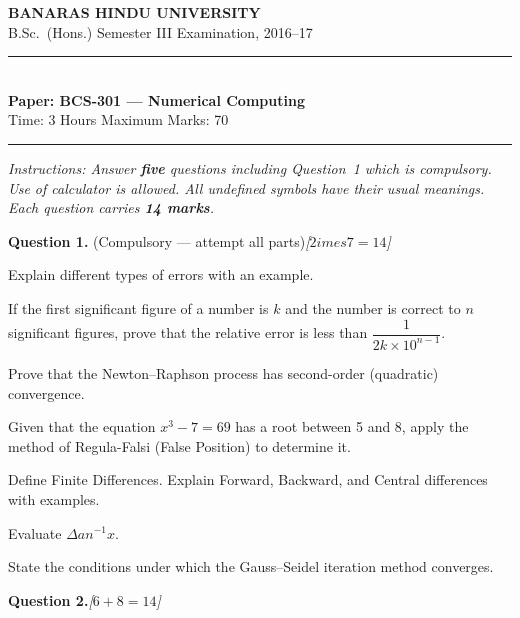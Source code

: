 \documentclass[11pt,a4paper]{article}
\newcommand{\pts}[1]{\hfill   \textit{[#1]}}
\begin{document}
\begin{center}
  {\large\bfseries BANARAS HINDU UNIVERSITY}\\[2pt]
  {\normalsize B.Sc.\ (Hons.) Semester III Examination, 2016--17}\\[6pt]
  \rule{0.8\linewidth}{0.5pt}\\[6pt]
  {\large\bfseries Paper: BCS-301 --- Numerical Computing}\\[4pt]
  {\normalsize Time: 3 Hours \hfill Maximum Marks: 70}
\end{center}

\rule{\linewidth}{0.4pt}

\smallskip



\noindent   \textit{Instructions: Answer   \textbf{five} questions including Question~1 which is compulsory. Use of calculator is allowed. All undefined symbols have their usual meanings. Each question carries   \textbf{14 marks}.}

\bigskip




\noindent   \textbf{Question 1.} (Compulsory --- attempt all parts)\pts{$2 imes7=14$}

\begin{parts}
  \item Explain different types of errors with an example.
  \item If the first significant figure of a number is $k$ and the number is correct to $n$ significant figures, prove that the relative error is less than $\dfrac{1}{2k  \times 10^{n-1}}$.
  \item Prove that the Newton--Raphson process has second-order (quadratic) convergence.
  \item Given that the equation $x^3 - 7 = 69$ has a root between 5 and 8, apply the method of Regula-Falsi (False Position) to determine it.
  \item Define Finite Differences. Explain Forward, Backward, and Central differences with examples.
  \item Evaluate $\Delta an^{-1}x$.
  \item State the conditions under which the Gauss--Seidel iteration method converges.
\end{parts}

\bigskip




\noindent   \textbf{Question 2.}\pts{$6+8=14$}
\end{document}
